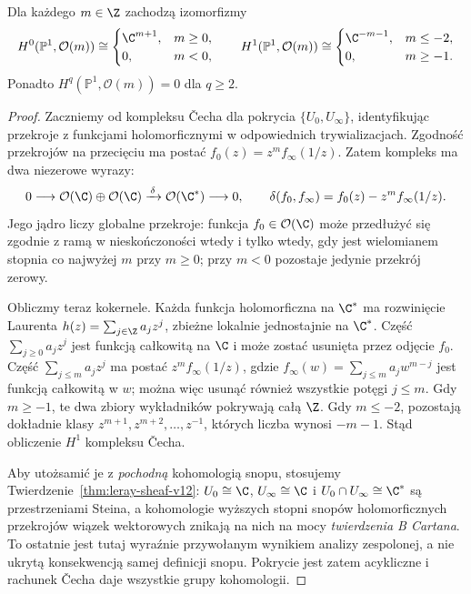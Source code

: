 \begin{twierdzenie}
\label{thm:p1-twist-v12}
Dla każdego $m\in\Z$ zachodzą izomorfizmy
\[
H^0(\mathbb P^1,\mathcal O(m))\cong
\begin{cases}\C^{m+1},&m\ge0,\\0,&m<0,\end{cases}
\qquad
H^1(\mathbb P^1,\mathcal O(m))\cong
\begin{cases}\C^{-m-1},&m\le-2,\\0,&m\ge-1.\end{cases}
\]
Ponadto $H^q(\mathbb P^1,\mathcal O(m))=0$ dla $q\ge2$.
\end{twierdzenie}
\begin{proof}
Zaczniemy od kompleksu \v{C}echa dla pokrycia
$\{U_0,U_\infty\}$, identyfikując przekroje z funkcjami
holomorficznymi w odpowiednich trywializacjach.
Zgodność przekrojów na przecięciu ma postać
$f_0(z)=z^m f_\infty(1/z)$.
Zatem kompleks ma dwa niezerowe wyrazy:
\[
0\longrightarrow
\mathcal O(\C)\oplus\mathcal O(\C)
\xrightarrow{\,\delta\,}\mathcal O(\C^*)
\longrightarrow0,
\qquad
\delta(f_0,f_\infty)=f_0(z)-z^m f_\infty(1/z).
\]
Jego jądro liczy globalne przekroje: funkcja
$f_0\in\mathcal O(\C)$ może przedłużyć się zgodnie
z ramą w nieskończoności wtedy i tylko wtedy,
gdy jest wielomianem stopnia co najwyżej $m$ przy $m\ge0$;
przy $m<0$ pozostaje jedynie przekrój zerowy.

Obliczmy teraz kokernele. Każda funkcja holomorficzna
na $\C^*$ ma rozwinięcie Laurenta
$h(z)=\sum_{j\in\Z}a_jz^j$, zbieżne lokalnie jednostajnie
na $\C^*$. Część $\sum_{j\ge0}a_jz^j$ jest funkcją
całkowitą na $\C$ i może zostać usunięta przez
odjęcie $f_0$. Część $\sum_{j\le m}a_jz^j$
ma postać $z^m f_\infty(1/z)$, gdzie
$f_\infty(w)=\sum_{j\le m}a_jw^{m-j}$ jest
funkcją całkowitą w $w$; można więc usunąć również
wszystkie potęgi $j\le m$. Gdy $m\ge-1$, te dwa
zbiory wykładników pokrywają całą $\Z$.
Gdy $m\le-2$, pozostają dokładnie klasy
$z^{m+1},z^{m+2},\ldots,z^{-1}$, których liczba wynosi
$-m-1$. Stąd obliczenie $H^1$ kompleksu \v{C}echa.

Aby utożsamić je z \emph{pochodną} kohomologią snopu,
stosujemy Twierdzenie~\ref{thm:leray-sheaf-v12}:
$U_0\cong\C$, $U_\infty\cong\C$ i
$U_0\cap U_\infty\cong\C^*$ są przestrzeniami Steina,
a kohomologie wyższych stopni snopów holomorficznych
przekrojów wiązek wektorowych znikają na nich
na mocy \emph{twierdzenia B Cartana}. To ostatnie
jest tutaj wyraźnie przywołanym wynikiem analizy
zespolonej, a nie ukrytą konsekwencją samej definicji
snopu. Pokrycie jest zatem acykliczne i rachunek
\v{C}echa daje wszystkie grupy kohomologii.
\end{proof}

